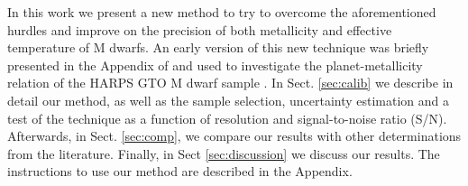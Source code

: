 \documentclass{aa}
\begin{document}


In this work we present a new method to try to overcome the aforementioned hurdles and improve on the precision of both metallicity and effective temperature of M dwarfs. An early version of this new technique was briefly presented in the Appendix of \citet{Neves-2013} and used to investigate the planet-metallicity relation of the HARPS GTO M dwarf sample \citep{Bonfils-2013}. In Sect. \ref{sec:calib} we describe in detail our method, as well as the sample selection, uncertainty estimation and a test of the technique as a function of resolution and signal-to-noise ratio (S/N). Afterwards, in Sect. \ref{sec:comp}, we compare our results with other determinations from the literature. Finally, in Sect \ref{sec:discussion} we discuss our results. The instructions to use our method are described in the Appendix.




\end{document}
